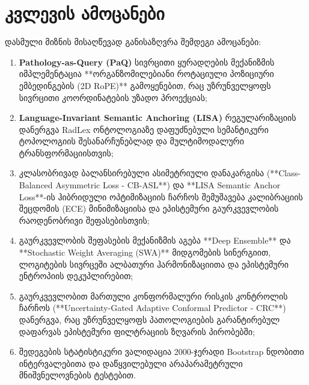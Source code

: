 \documentclass[12pt,a4paper,oneside]{report}
\begin{document}
\section{კვლევის ამოცანები}
დასმული მიზნის მისაღწევად განისაზღვრა შემდეგი ამოცანები:
\begin{enumerate}[leftmargin=1.6em]
    \item \textbf{Pathology-as-Query (PaQ)} სივრცითი ყურადღების მექანიზმის იმპლემენტაცია **ორგანზომილებიანი როტაციული პოზიციური ემბედინგების (2D RoPE)** გამოყენებით, რაც უზრუნველყოფს სივრცითი კოორდინატების უზადო პროექციას;
    \item \textbf{Language-Invariant Semantic Anchoring (LISA)} რეგულარიზაციის დანერგვა RadLex ონტოლოგიაზე დაფუძნებული სემანტიკური ტოპოლოგიის შესანარჩუნებლად და მულტიმოდალური ტრანსფორმაციისთვის;
    \item კლასობრივად ბალანსირებული ასიმეტრიული დანაკარგისა (**Class-Balanced Asymmetric Loss - CB-ASL**) და **LISA Semantic Anchor Loss**-ის ჰიბრიდული ოპტიმიზაციის ჩარჩოს შემუშავება კალიბრაციის შეცდომის (ECE) მინიმიზაციისა და ეპისტემური გაურკვევლობის რაოდენობრივი შეფასებისთვის;
    \item გაურკვევლობის შეფასების მექანიზმის აგება **Deep Ensemble** და **Stochastic Weight Averaging (SWA)** მიდგომების სინერგიით, ლოგიტების სივრცეში ალბათური ჰარმონიზაციითა და ეპისტემური ენტროპიის დეკუპლირებით;
    \item გაურკვევლობით მართული კონფორმალური რისკის კონტროლის ჩარჩოს (**Uncertainty-Gated Adaptive Conformal Predictor - CRC**) დანერგვა, რაც უზრუნველყოფს პათოლოგიების გარანტირებულ დაფარვას ეპისტემური ფილტრაციის ზღვარის პირობებში;
    \item შედეგების სტატისტიკური ვალიდაცია 2000-ჯერადი Bootstrap ნდობითი ინტერვალებითა და დაწყვილებული არაპარამეტრული მნიშვნელოვნების ტესტებით.
\end{enumerate}
\end{document}
